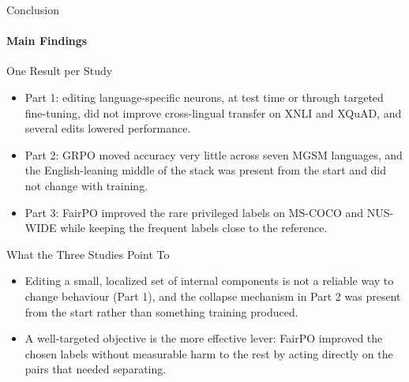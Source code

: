 \documentclass[aspectratio=169]{beamer}
\begin{document}
	\begin{frame}{Conclusion}
		\framesubtitle{Main Findings}
		\begin{block}{\scriptsize One Result per Study}\scriptsize
			\begin{itemize}
				\item Part 1: editing language-specific neurons, at test time or through targeted fine-tuning, did not improve cross-lingual transfer on XNLI and XQuAD, and several edits lowered performance.
				\item Part 2: GRPO moved accuracy very little across seven MGSM languages, and the English-leaning middle of the stack was present from the start and did not change with training.
				\item Part 3: FairPO improved the rare privileged labels on MS-COCO and NUS-WIDE while keeping the frequent labels close to the reference.
			\end{itemize}
		\end{block}
		\begin{block}{\scriptsize What the Three Studies Point To}\scriptsize
			\begin{itemize}
				\item Editing a small, localized set of internal components is not a reliable way to change behaviour (Part 1), and the collapse mechanism in Part 2 was present from the start rather than something training produced.
				\item A well-targeted objective is the more effective lever: FairPO improved the chosen labels without measurable harm to the rest by acting directly on the pairs that needed separating.
			\end{itemize}
		\end{block}
	\end{frame}
	
\end{document}

